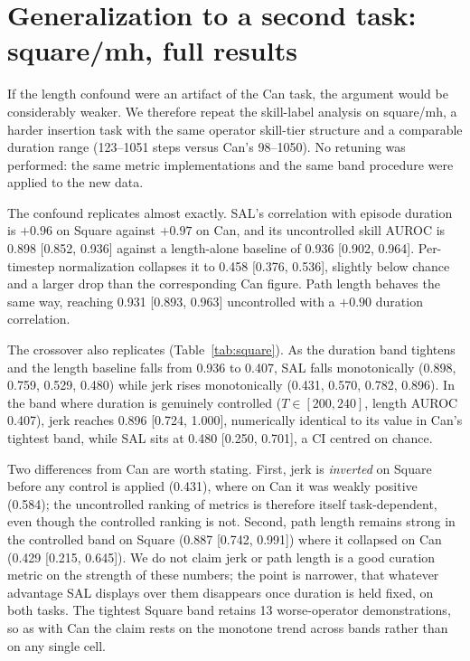 \documentclass[10pt]{article}
\begin{document}
\clearpage
\appendix

\section{Generalization to a second task: square/mh, full results}
\label{app:square}

If the length confound were an artifact of the Can task, the argument would
be considerably weaker. We therefore repeat the skill-label analysis on
square/mh, a harder insertion task with the same operator skill-tier
structure and a comparable duration range (123--1051 steps versus Can's
98--1050). No retuning was performed: the same metric implementations and
the same band procedure were applied to the new data.

The confound replicates almost exactly. SAL's correlation with episode
duration is $+0.96$ on Square against $+0.97$ on Can, and its uncontrolled
skill AUROC is 0.898 [0.852, 0.936] against a length-alone baseline of 0.936
[0.902, 0.964]. Per-timestep normalization collapses it to 0.458 [0.376,
0.536], slightly below chance and a larger drop than the corresponding Can
figure. Path length behaves the same way, reaching 0.931 [0.893, 0.963]
uncontrolled with a $+0.90$ duration correlation.

The crossover also replicates (Table~\ref{tab:square}). As the duration band
tightens and the length baseline falls from 0.936 to 0.407, SAL falls
monotonically (0.898, 0.759, 0.529, 0.480) while jerk rises monotonically
(0.431, 0.570, 0.782, 0.896). In the band where duration is genuinely
controlled ($T \in [200,240]$, length AUROC 0.407), jerk reaches 0.896
[0.724, 1.000], numerically identical to its value in Can's tightest band,
while SAL sits at 0.480 [0.250, 0.701], a CI centred on chance.

Two differences from Can are worth stating. First, jerk is \emph{inverted}
on Square before any control is applied (0.431), where on Can it was weakly
positive (0.584); the uncontrolled ranking of metrics is therefore itself
task-dependent, even though the controlled ranking is not. Second, path
length remains strong in the controlled band on Square (0.887 [0.742,
0.991]) where it collapsed on Can (0.429 [0.215, 0.645]). We do not claim
jerk or path length is a good curation metric on the strength of these
numbers; the point is narrower, that whatever advantage SAL displays over
them disappears once duration is held fixed, on both tasks. The tightest
Square band retains 13 worse-operator demonstrations, so as with Can the
claim rests on the monotone trend across bands rather than on any single
cell.
\end{document}
